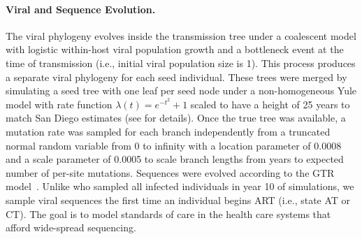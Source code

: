 \documentclass[a4paper,11pt]{article}
\newcommand{\authorcite}[1]{\citeauthor{#1}\supercite{#1}}
\begin{document}
\paragraph{Viral and Sequence Evolution.}
The viral phylogeny evolves inside the transmission tree under a coalescent model  with logistic within-host viral population growth and a bottleneck event at the time of transmission (i.e., initial viral population size is 1).\supercite{Ratmann2017}
This process produces a separate viral phylogeny for each seed individual.
These trees were merged by simulating a seed tree with one leaf per seed node under a non-homogeneous Yule model \supercite{LeGat2016} with rate function $\lambda(t)=e^{-t^2}+1$ scaled to have a height of 25 years to match  San Diego estimates (see \authorcite{Moshiri2018} for details). 
Once the true tree was available, a mutation rate was sampled for each branch independently from a truncated normal random variable from 0 to infinity with a location parameter of 0.0008 and a scale parameter of 0.0005 to scale branch lengths from years to expected number of per-site mutations.\supercite{Moshiri2018}
Sequences were evolved according to the GTR model~\supercite{gtr}.
Unlike  \authorcite{Moshiri2018} who sampled all infected individuals in year 10 of simulations,
we sample viral sequences the first time an individual begins ART (i.e., state AT or CT).
The goal is to model standards of care in the health care systems  that %
afford wide-spread sequencing. 
\end{document}
